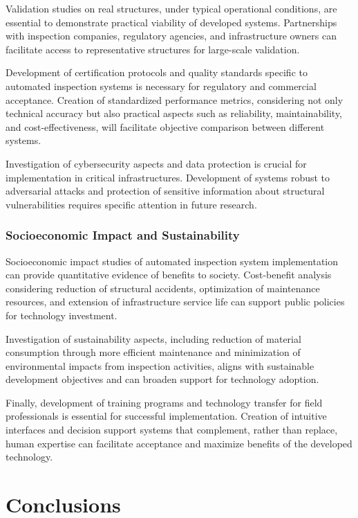 \documentclass[12pt,a4paper,twoside]{article}
\begin{document}
Validation studies on real structures, under typical operational conditions, are essential to demonstrate practical viability of developed systems. Partnerships with inspection companies, regulatory agencies, and infrastructure owners can facilitate access to representative structures for large-scale validation.

Development of certification protocols and quality standards specific to automated inspection systems is necessary for regulatory and commercial acceptance. Creation of standardized performance metrics, considering not only technical accuracy but also practical aspects such as reliability, maintainability, and cost-effectiveness, will facilitate objective comparison between different systems.

Investigation of cybersecurity aspects and data protection is crucial for implementation in critical infrastructures. Development of systems robust to adversarial attacks and protection of sensitive information about structural vulnerabilities requires specific attention in future research.

\subsubsection{Socioeconomic Impact and Sustainability}

Socioeconomic impact studies of automated inspection system implementation can provide quantitative evidence of benefits to society. Cost-benefit analysis considering reduction of structural accidents, optimization of maintenance resources, and extension of infrastructure service life can support public policies for technology investment.

Investigation of sustainability aspects, including reduction of material consumption through more efficient maintenance and minimization of environmental impacts from inspection activities, aligns with sustainable development objectives and can broaden support for technology adoption.

Finally, development of training programs and technology transfer for field professionals is essential for successful implementation. Creation of intuitive interfaces and decision support systems that complement, rather than replace, human expertise can facilitate acceptance and maximize benefits of the developed technology.

\section{Conclusions}
\label{sec:conclusions}
\end{document}
